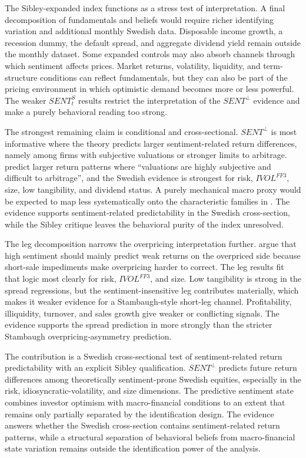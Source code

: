 \documentclass[11pt]{article}
\newcommand{\var}[1]{\ensuremath{#1}}
\begin{document}
The Sibley-expanded index functions as a stress test of interpretation. A final decomposition of fundamentals and beliefs would require richer identifying variation and additional monthly Swedish data. Disposable income growth, a recession dummy, the default spread, and aggregate dividend yield remain outside the monthly dataset. Some expanded controls may also absorb channels through which sentiment affects prices. Market returns, volatility, liquidity, and term-structure conditions can reflect fundamentals, but they can also be part of the pricing environment in which optimistic demand becomes more or less powerful. The weaker \var{SENT^{S}_{t}} results restrict the interpretation of the \var{SENT^{\perp}} evidence and make a purely behavioral reading too strong.

The strongest remaining claim is conditional and cross-sectional. \var{SENT^{\perp}} is most informative where the theory predicts larger sentiment-related return differences, namely among firms with subjective valuations or stronger limits to arbitrage. \citet{baker2006sentiment} predict larger return patterns where \enquote{valuations are highly subjective and difficult to arbitrage}, and the Swedish evidence is strongest for risk, \var{IVOL^{FF3}}, size, low tangibility, and dividend status. A purely mechanical macro proxy would be expected to map less systematically onto the characteristic families in \citet{baker2006sentiment}. The evidence supports sentiment-related predictability in the Swedish cross-section, while the Sibley critique leaves the behavioral purity of the index unresolved.

The leg decomposition narrows the overpricing interpretation further. \citet{stambaugh2012short} argue that high sentiment should mainly predict weak returns on the overpriced side because short-sale impediments make overpricing harder to correct. The leg results fit that logic most clearly for risk, \var{IVOL^{FF3}}, and size. Low tangibility is strong in the spread regressions, but the sentiment-insensitive leg contributes materially, which makes it weaker evidence for a Stambaugh-style short-leg channel. Profitability, illiquidity, turnover, and sales growth give weaker or conflicting signals. The evidence supports the spread prediction in \citet{baker2006sentiment} more strongly than the stricter Stambaugh overpricing-asymmetry prediction.

The contribution is a Swedish cross-sectional test of sentiment-related return predictability with an explicit Sibley qualification. \var{SENT^{\perp}} predicts future return differences among theoretically sentiment-prone Swedish equities, especially in the risk, idiosyncratic-volatility, and size dimensions. The predictive sentiment state combines investor optimism with macro-financial conditions to an extent that remains only partially separated by the identification design. The evidence answers whether the Swedish cross-section contains sentiment-related return patterns, while a structural separation of behavioral beliefs from macro-financial state variation remains outside the identification power of the analysis.
\end{document}
